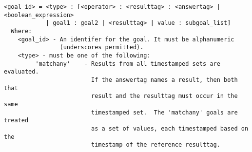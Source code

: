 \documentclass[12pt]{article}
\begin{document}
\begin{verbatim}
<goal_id> = <type> : [<operator> : <resulttag> : <answertag> | <boolean_expression> 
            | goal1 : goal2 | <resulttag> | value : subgoal_list]
  Where: 
    <goal_id> - An identifer for the goal. It must be alphanumeric 
                (underscores permitted).
    <type> - must be one of the following:
         'matchany'    - Results from all timestamped sets are evaluated.
                         If the answertag names a result, then both that 
                         result and the resulttag must occur in the same 
                         timestamped set.  The 'matchany' goals are treated 
                         as a set of values, each timestamped based on the 
                         timestamp of the reference resulttag.
                      

\end{verbatim}
\end{document}
